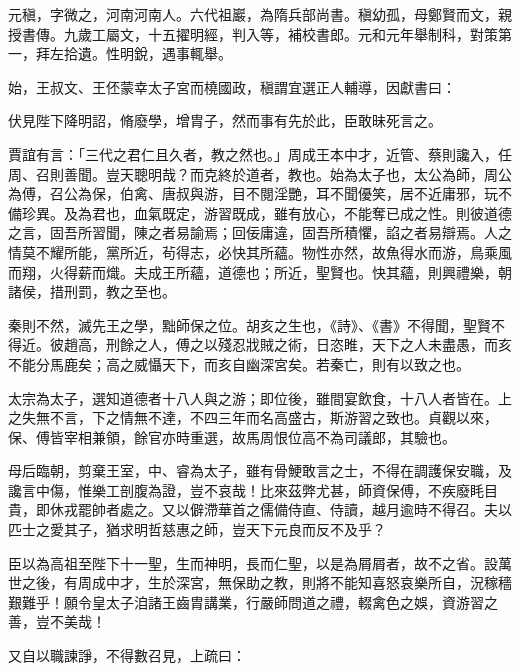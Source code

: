\begin{pinyinscope}
 元稹，字微之，河南河南人。六代祖巖，為隋兵部尚書。稹幼孤，母鄭賢而文，親授書傳。九歲工屬文，十五擢明經，判入等，補校書郎。元和元年舉制科，對策第一，拜左拾遺。性明銳，遇事輒舉。



 始，王叔文、王伾蒙幸太子宮而橈國政，稹謂宜選正人輔導，因獻書曰：



 伏見陛下降明詔，脩廢學，增胄子，然而事有先於此，臣敢昧死言之。



 賈誼有言：「三代之君仁且久者，教之然也。」周成王本中才，近管、蔡則讒入，任周、召則善聞。豈天聰明哉？而克終於道者，教也。始為太子也，太公為師，周公為傅，召公為保，伯禽、唐叔與游，目不閱淫艷，耳不聞優笑，居不近庸邪，玩不備珍異。及為君也，血氣既定，游習既成，雖有放心，不能奪已成之性。則彼道德之言，固吾所習聞，陳之者易諭焉；回佞庸違，固吾所積懼，諂之者易辯焉。人之情莫不耀所能，黨所近，茍得志，必快其所蘊。物性亦然，故魚得水而游，鳥乘風而翔，火得薪而熾。夫成王所蘊，道德也；所近，聖賢也。快其蘊，則興禮樂，朝諸侯，措刑罰，教之至也。



 秦則不然，滅先王之學，黜師保之位。胡亥之生也，《詩》、《書》不得聞，聖賢不得近。彼趙高，刑餘之人，傅之以殘忍戕賊之術，日恣睢，天下之人未盡愚，而亥不能分馬鹿矣；高之威懾天下，而亥自幽深宮矣。若秦亡，則有以致之也。



 太宗為太子，選知道德者十八人與之游；即位後，雖間宴飲食，十八人者皆在。上之失無不言，下之情無不達，不四三年而名高盛古，斯游習之致也。貞觀以來，保、傅皆宰相兼領，餘官亦時重選，故馬周恨位高不為司議郎，其驗也。



 母后臨朝，剪棄王室，中、睿為太子，雖有骨鯁敢言之士，不得在調護保安職，及讒言中傷，惟樂工剖腹為證，豈不哀哉！比來茲弊尤甚，師資保傅，不疾廢眊目貴，即休戎罷帥者處之。又以僻滯華首之儒備侍直、侍讀，越月逾時不得召。夫以匹士之愛其子，猶求明哲慈惠之師，豈天下元良而反不及乎？



 臣以為高祖至陛下十一聖，生而神明，長而仁聖，以是為屑屑者，故不之省。設萬世之後，有周成中才，生於深宮，無保助之教，則將不能知喜怒哀樂所自，況稼穡艱難乎！願令皇太子洎諸王齒胄講業，行嚴師問道之禮，輟禽色之娛，資游習之善，豈不美哉！



 又自以職諫諍，不得數召見，上疏曰：




\end{pinyinscope}
